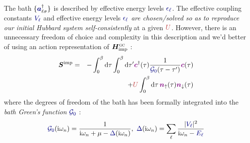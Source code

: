 \documentclass[reprint,amsmath,amssymb,aps,pra]{revtex4-2}
\newcommand{\mathi}{\mathrm{i}}
\newcommand{\tmem}[1]{{\em #1\/}}
\newcommand{\tmbf}[1]{\ensuremath{\boldsymbol{#1}}}
\newcommand{\tmname}[1]{\textsc{#1}}
\newcommand{\iwn}{\mathrm{i}\omega_n}
\begin{document}
The {\color[HTML]{000080}bath} $\{ {\color[HTML]{000080}\tmbf{a}}_{\ell
\sigma}^{\dag} \}$ is described by effective energy levels
${\color[HTML]{000080}\epsilon_{\ell}}$. The effective coupling constants ${\color[HTML]{000080}V_{\ell}}$ and effective energy levels
${\color[HTML]{000080}\epsilon_{\ell}}$ {\tmem{are chosen/solved so as to reproduce our initial Hubbard system self-consistently}} at a given
${\color[HTML]{BF4040}U}$. However, there is an unnecessary freedom of choice
and complexity in this description and we'd better of using an action representation of $\tmbf{H}_{\text{imp}}^{\mathrm{{\tmname{gc}}}}$ :
\begin{eqnarray*}
  \tmbf{S}^\text{imp} &=& {- \int_0^{\beta} \dd{\tau}
  \int_0^{\beta} \dd{\tau'}}  {\color[HTML]{800080}\tmbf{c}}^{\dag}
  (\tau)  \frac{1}{{\color[HTML]{000080}\mathcal{G}_0} (\tau - \tau')} 
  {\color[HTML]{800080}\tmbf{c}}(\tau)\\ &&\ + {\color[HTML]{BF4040}U}  \int_0^{\beta} \dd{\tau} {\color[HTML]{800080}\tmbf{n}}_{\uparrow} (\tau) {\color[HTML]{800080}\tmbf{n}}_{\downarrow}(\tau)
  \label{impurity-action}
\end{eqnarray*}
where the degrees of freedom of the bath has been formally
integrated into the \emph{bath Green's
function} ${\color[HTML]{000080}\mathcal{G}_0}$ :
\begin{equation*}
  {\color[HTML]{000080}\mathcal{G}_0} (\iwn) = \frac{1}{\mathi
  \omega_n + \mu - {\color[HTML]{000080}\Delta} (\mathi
  \omega_n)},\ {\color[HTML]{000080}\Delta} (\mathi
  \omega_n) = \sum_{\ell} \frac{| {\color[HTML]{000080}V_{\ell}} |^2}{\mathi
  \omega_n - {\color[HTML]{000080}E_{\ell}}} \label{bath-G-with-Delta-func}
\end{equation*}
\end{document}
